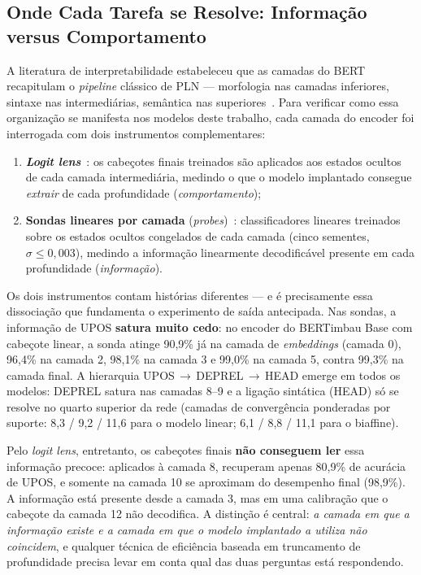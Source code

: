 \subsection{Onde Cada Tarefa se Resolve: Informação versus Comportamento}
\label{subsec:camadas_leitura}

A literatura de interpretabilidade estabeleceu que as camadas do BERT recapitulam o
\textit{pipeline} clássico de PLN --- morfologia nas camadas inferiores, sintaxe nas
intermediárias, semântica nas superiores~\citep{tenney2019bert}. Para verificar como essa
organização se manifesta nos modelos deste trabalho, cada camada do encoder foi interrogada
com dois instrumentos complementares:

\begin{enumerate}
  \item \textbf{\textit{Logit lens}}~\citep{nostalgebraist2020logitlens}: os cabeçotes finais
        treinados são aplicados aos estados ocultos de cada camada intermediária, medindo o que
        o modelo implantado consegue \emph{extrair} de cada profundidade (\emph{comportamento});
  \item \textbf{Sondas lineares por camada} (\textit{probes})~\citep{hewitt2019structural}:
        classificadores lineares treinados sobre os estados ocultos congelados de cada camada
        (cinco sementes, $\sigma \leq 0{,}003$), medindo a informação linearmente decodificável
        presente em cada profundidade (\emph{informação}).
\end{enumerate}

Os dois instrumentos contam histórias diferentes --- e é precisamente essa dissociação que
fundamenta o experimento de saída antecipada. Nas sondas, a informação de UPOS
\textbf{satura muito cedo}: no encoder do BERTimbau Base com cabeçote linear, a sonda atinge
90,9\% já na camada de \textit{embeddings} (camada 0), 96,4\% na camada 2, 98,1\% na camada 3 e
99,0\% na camada 5, contra 99,3\% na camada final. A hierarquia
UPOS\,$\rightarrow$\,DEPREL\,$\rightarrow$\,HEAD emerge em todos os modelos: DEPREL satura nas
camadas 8--9 e a ligação sintática (HEAD) só se resolve no quarto superior da rede (camadas de
convergência ponderadas por suporte: 8,3 / 9,2 / 11,6 para o modelo linear; 6,1 / 8,8 / 11,1
para o biaffine).

Pelo \textit{logit lens}, entretanto, os cabeçotes finais \textbf{não conseguem ler} essa
informação precoce: aplicados à camada 8, recuperam apenas 80,9\% de acurácia de UPOS, e somente
na camada 10 se aproximam do desempenho final (98,9\%). A informação está presente desde a
camada 3, mas em uma calibração que o cabeçote da camada 12 não decodifica. A distinção é
central: \emph{a camada em que a informação existe e a camada em que o modelo implantado a
utiliza não coincidem}, e qualquer técnica de eficiência baseada em truncamento de profundidade
precisa levar em conta qual das duas perguntas está respondendo.

